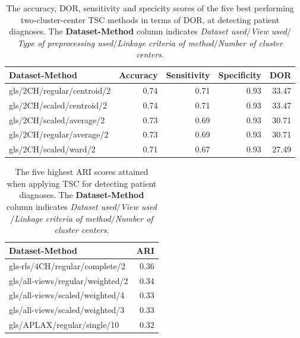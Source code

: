 \begin{table}
    \centering
    \begin{tabular}{lrrrr}
        \toprule
        Dataset-Method             &  Accuracy &  Sensitivity &  Specificity &   DOR \\
        \midrule
        gls/2CH/regular/centroid/2 &      0.74 &         0.71 &         0.93 & 33.47 \\
        gls/2CH/scaled/centroid/2  &      0.74 &         0.71 &         0.93 & 33.47 \\
        gls/2CH/scaled/average/2   &      0.73 &         0.69 &         0.93 & 30.71 \\
        gls/2CH/regular/average/2  &      0.73 &         0.69 &         0.93 & 30.71 \\
        gls/2CH/scaled/ward/2      &      0.71 &         0.67 &         0.93 & 27.49 \\
        \bottomrule
    \end{tabular}
    \caption{The accuracy, DOR, sensitivity and specicity scores of the five best performing two-cluster-center TSC methods in terms of DOR, at detecting patient diagnoses.
             The \textbf{Dataset-Method} column indicates 
             \textit{Dataset used}$/$\textit{View used}$/$\textit{Type of preprocessing used}$/$\textit{Linkage criteria of method}$/$\textit{Number of cluster centers}.}
    \label{tab:tsc_ind_dor_sens_spec_dist}
\end{table}

\begin{table}
    \centering
    \begin{tabular}{lr}
        \toprule
        Dataset-Method                   &  ARI \\
        \midrule
        gls-rls/4CH/regular/complete/2   & 0.36 \\
        gls/all-views/regular/weighted/2 & 0.34 \\
        gls/all-views/scaled/weighted/4  & 0.33 \\
        gls/all-views/scaled/weighted/3  & 0.33 \\
        gls/APLAX/regular/single/10      & 0.32 \\
        \bottomrule
    \end{tabular}
    \caption{The five highest ARI scores attained when applying TSC for detecting patient diagnoses.
             The \textbf{Dataset-Method} column indicates \textit{Dataset used}$/$\textit{View used}$/$\textit{Linkage criteria of method}$/$\textit{Number of cluster centers}.}
    \label{tab:tsc_ind_ari}
\end{table}

